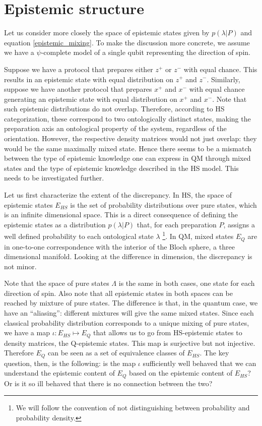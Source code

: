 \documentclass[twocolumn,prl,floatfix,superscriptaddress]{revtex4-2}
\begin{document}
\section{Epistemic structure}

Let us consider more closely the space of epistemic states given by $p(\lambda | P)$ and equation \ref{epistemic_mixing}. To make the discussion more concrete, we assume we have a $\psi$-complete model of a single qubit representing the direction of spin.

Suppose we have a protocol that prepares either $z^+$ or $z^-$ with equal chance. This results in an epistemic state with equal distribution on $z^+$ and $z^-$. Similarly, suppose we have another protocol that prepares $x^+$ and $x^-$ with equal chance generating an epistemic state with equal distribution on $x^+$ and $x^-$. Note that such epistemic distributions do not overlap. Therefore, according to HS categorization, these correspond to two ontologically distinct states, making the preparation axis an ontological property of the system, regardless of the orientation. However, the respective density matrices would not just overlap: they would be the same maximally mixed state. Hence there seems to be a mismatch between the type of epistemic knowledge one can express in QM through mixed states and the type of epistemic knowledge described in the HS model. This needs to be investigated further.

Let us first characterize the extent of the discrepancy. In HS, the space of epistemic states $E_{HS}$ is the set of probability distributions over pure states, which is an infinite dimensional space. This is a direct consequence of defining the epistemic states as a distribution $p(\lambda|P)$ that, for each preparation $P$, assigns a well defined probability to each ontological state $\lambda$ \footnote{We will follow the convention of not distinguishing between probability and probability density.}. In QM, mixed states $E_{Q}$ are in one-to-one correspondence with the interior of the Bloch sphere, a three dimensional manifold. Looking at the difference in dimension, the discrepancy is not minor.

Note that the space of pure states $\Lambda$ is the same in both cases, one state for each direction of spin. Also note that all epistemic states in both spaces can be reached by mixture of pure states. The difference is that, in the quantum case, we have an ``aliasing'': different mixtures will give the same mixed states. Since each classical probability distribution corresponds to a unique mixing of pure states, we have a map $\iota : E_{HS} \mapsto E_{Q}$ that allows us to go from HS-epistemic states to density matrices, the Q-epistemic states. This map is surjective but not injective. Therefore $E_{Q}$ can be seen as a set of equivalence classes of $E_{HS}$. The key question, then, is the following: is the map $\iota$ sufficiently well behaved that we can understand the epistemic content of $E_{Q}$ based on the epistemic content of $E_{HS}$? Or is it so ill behaved that there is no connection between the two?
\end{document}
